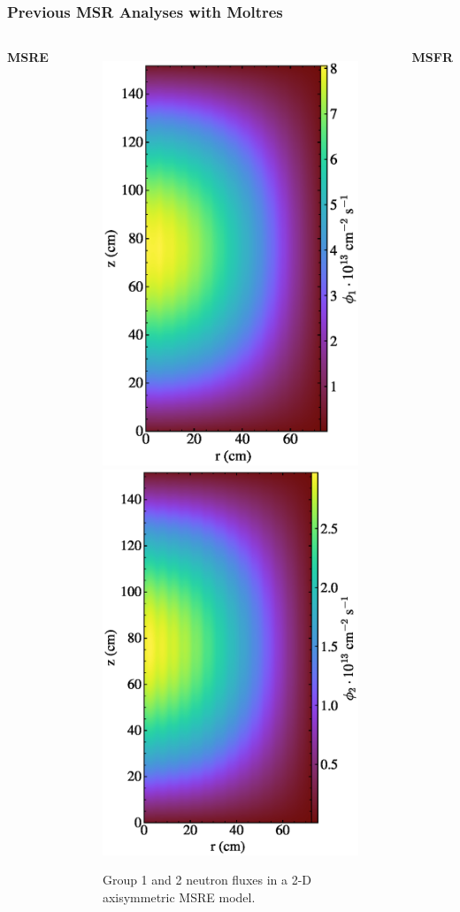 \begin{frame}
  \frametitle{Previous MSR Analyses with Moltres}
  \begin{columns}
    \hfill
    \column[t]{4cm}
      \textbf{\gls{MSRE} \cite{lindsay_moltres_2017}}
      \vfill
      \begin{figure}
        \centering
	    \includegraphics[width=.48\columnwidth]{../images/2d_gamma_heating_group1}
        \hfill
	    \includegraphics[width=.48\columnwidth]{../images/2d_gamma_heating_group2}
	    \caption{\footnotesize Group 1 and 2 neutron fluxes in a 2-D axisymmetric MSRE
	      model.}
      \end{figure}
    \hfill
    \column[t]{3.5cm}
      \textbf{\gls{MSFR} \cite{park_advancement_2020}}

\end{columns}
\end{frame}
